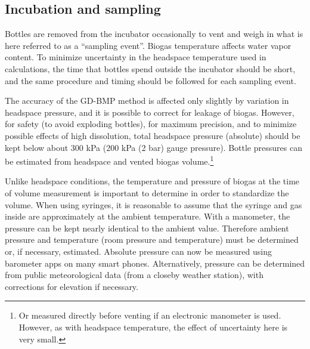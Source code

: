 \documentclass[]{article}
\begin{document}
\subsection{Incubation and sampling}
Bottles are removed from the incubator occasionally to vent and weigh in what is here referred to as a ``sampling event''. 
Biogas temperature affects water vapor content. 
To minimize uncertainty in the headspace temperature used in calculations, the time that bottles spend outside the incubator should be short, and the same procedure and timing should be followed for each sampling event. 

The accuracy of the GD-BMP method is affected only slightly by variation in headspace pressure, and it is possible to correct for leakage of biogas. 
However, for safety (to avoid exploding bottles), for maximum precision, and to minimize possible effects of high  dissolution, total headspace pressure (absolute) should be kept below about 300 kPa (200 kPa (2 bar) gauge pressure). 
Bottle pressures can be estimated from headspace and vented biogas volume.\footnote{
  Or measured directly before venting if an electronic manometer is used.
  However, as with headspace temperature, the effect of uncertainty here is very small.
}

Unlike headspace conditions, the temperature and pressure of biogas at the time of volume measurement is important to determine in order to standardize the volume.
When using syringes, it is reasonable to assume that the syringe and gas inside are approximately at the ambient temperature.
With a manometer, the pressure can be kept nearly identical to the ambient value.
Therefore ambient pressure and temperature (room pressure and temperature) must be determined or, if necessary, estimated.
Absolute pressure can now be measured using barometer apps on many smart phones.
Alternatively, pressure can be determined from public meteorological data (from a closeby weather station), with corrections for elevation if necessary.
\end{document}
